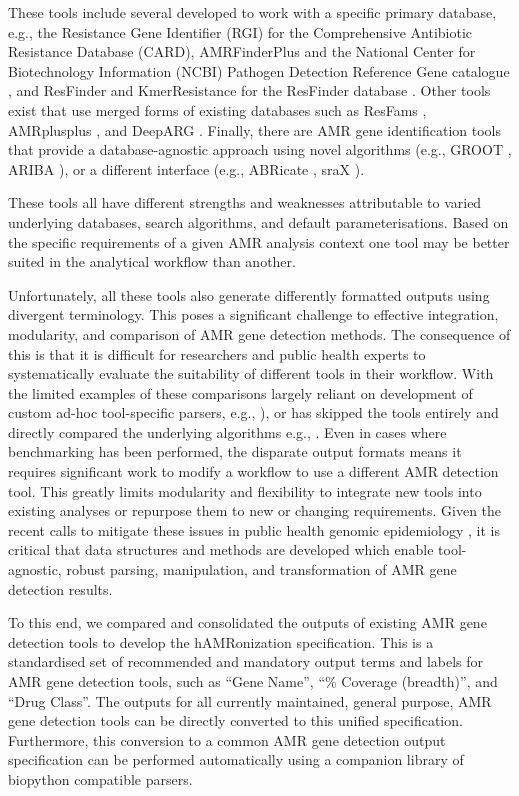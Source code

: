 These tools include several developed to work with a specific primary database, e.g., the Resistance Gene Identifier (RGI) for the Comprehensive Antibiotic Resistance Database (CARD)\cite{alcock_card_2020}, AMRFinderPlus and the National Center for Biotechnology Information (NCBI) Pathogen Detection Reference Gene catalogue \cite{feldgarden_validating_2019}, and ResFinder and KmerResistance \cite{clausen_benchmarking_2016} for the ResFinder database \cite{zankari_identification_2012}. Other tools exist that use merged forms of existing databases such as ResFams \cite{gibson_improved_2015}, AMRplusplus \cite{doster_megares_2020}, and DeepARG \cite{arango-argoty_deeparg_2018}. Finally, there are AMR gene identification tools that provide a database-agnostic approach using novel algorithms (e.g., GROOT \cite{rowe_indexed_2018}, ARIBA \cite{hunt_ariba_2017}), or a different interface (e.g., ABRicate \cite{torsten_seeman_abricate_2020}, sraX \cite{panunzi_srax_2020}). 

These tools all have different strengths and weaknesses attributable to varied underlying databases, search algorithms, and default parameterisations.  Based on the specific requirements of a given AMR analysis context one tool may be better suited in the analytical workflow than another.    

Unfortunately, all these tools also generate differently formatted outputs using divergent terminology.  This poses a significant challenge to effective integration, modularity, and comparison of AMR gene detection methods.  The consequence of this is that it is difficult for researchers and public health experts to systematically evaluate the suitability of different tools in their workflow. With the limited examples of these comparisons largely reliant on development of custom ad-hoc tool-specific parsers, e.g., \cite{feldgarden_validating_2019, hunt_ariba_2017}), or has skipped the tools entirely and directly compared the underlying algorithms e.g., \cite{mccall_comparative_2018}. Even in cases where benchmarking has been performed, the disparate output formats means it requires significant work to modify a workflow to use a different AMR detection tool. This greatly limits modularity and flexibility to integrate new tools into existing analyses or repurpose them to new or changing requirements. Given the recent calls to mitigate these issues in public health genomic epidemiology \cite{black_ten_2020}, it is critical that data structures and methods are developed which enable tool-agnostic, robust parsing, manipulation, and transformation of AMR gene detection results.

To this end, we compared and consolidated the outputs of existing AMR gene detection tools to develop the hAMRonization specification. This is a standardised set of recommended and mandatory output terms and labels for AMR gene detection tools, such as “Gene Name”, “\% Coverage (breadth)”, and “Drug Class”.  The outputs for all currently maintained, general purpose, AMR gene detection tools can be directly converted to this unified specification.  Furthermore, this conversion to a common AMR gene detection output specification can be performed automatically using a companion library of biopython compatible parsers.

